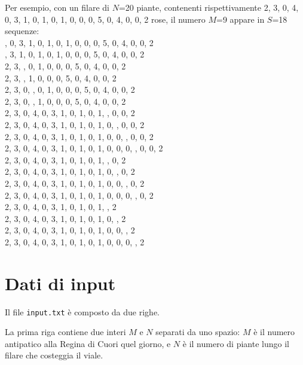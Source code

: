 \documentclass[a4paper,11pt]{article}
\begin{document}
Per esempio, con un filare di $N$=20 piante, contenenti
rispettivamente 2, 3, 0, 4, 0, 3, 1, 0, 1, 0, 1, 0, 0, 0, 5, 0, 4, 0,
0, 2 rose, il numero
$M$=9 appare in $S$=18 sequenze:\\
, 0, 3, 1, 0, 1, 0, 1, 0, 0, 0, 5, 0, 4, 0, 0, 2\\ 
, 3, 1, 0, 1, 0, 1, 0, 0, 0, 5, 0, 4, 0, 0, 2\\ 
2, 3, , 0, 1, 0, 0, 0, 5, 0, 4, 0, 0, 2\\ 
2, 3, , 1, 0, 0, 0, 5, 0, 4, 0, 0, 2\\ 
2, 3, 0, , 0, 1, 0, 0, 0, 5, 0, 4, 0, 0, 2\\ 
2, 3, 0, , 1, 0, 0, 0, 5, 0, 4, 0, 0, 2\\ 
2, 3, 0, 4, 0, 3, 1, 0, 1, 0, 1, , 0, 0, 2\\ 
2, 3, 0, 4, 0, 3, 1, 0, 1, 0, 1, 0, , 0, 0, 2\\ 
2, 3, 0, 4, 0, 3, 1, 0, 1, 0, 1, 0, 0, , 0, 0, 2\\ 
2, 3, 0, 4, 0, 3, 1, 0, 1, 0, 1, 0, 0, 0, , 0, 0, 2\\ 
2, 3, 0, 4, 0, 3, 1, 0, 1, 0, 1, , 0, 2\\ 
2, 3, 0, 4, 0, 3, 1, 0, 1, 0, 1, 0, , 0, 2\\ 
2, 3, 0, 4, 0, 3, 1, 0, 1, 0, 1, 0, 0, , 0, 2\\ 
2, 3, 0, 4, 0, 3, 1, 0, 1, 0, 1, 0, 0, 0, , 0, 2\\ 
2, 3, 0, 4, 0, 3, 1, 0, 1, 0, 1, , 2\\ 
2, 3, 0, 4, 0, 3, 1, 0, 1, 0, 1, 0, , 2\\ 
2, 3, 0, 4, 0, 3, 1, 0, 1, 0, 1, 0, 0, , 2\\ 
2, 3, 0, 4, 0, 3, 1, 0, 1, 0, 1, 0, 0, 0, , 2\\ 


\section*{Dati di input}
  Il file \texttt{input.txt} è composto da due righe.

La prima riga contiene due interi $M$ e $N$ separati
da uno spazio: $M$ è il numero antipatico alla
Regina di Cuori quel giorno, e $N$ è il numero di piante lungo il
filare che costeggia il viale.
\end{document}
